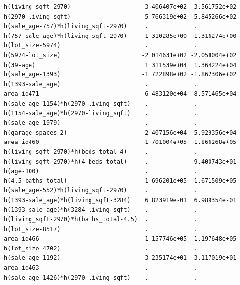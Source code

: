 \documentclass[
]{article}
\begin{document}
\begin{verbatim}
h(living_sqft-2970)                     3.406407e+02  3.561752e+02
h(2970-living_sqft)                    -5.766319e+02 -5.845266e+02
h(sale_age-757)*h(living_sqft-2970)     .             .           
h(757-sale_age)*h(living_sqft-2970)     1.310285e+00  1.316274e+00
h(lot_size-5974)                        .             .           
h(5974-lot_size)                       -2.014631e+02 -2.058004e+02
h(39-age)                               1.311539e+04  1.364224e+04
h(sale_age-1393)                       -1.722898e+02 -1.862306e+02
h(1393-sale_age)                        .             .           
area_id471                             -6.483120e+04 -8.571465e+04
h(sale_age-1154)*h(2970-living_sqft)    .             .           
h(1154-sale_age)*h(2970-living_sqft)    .             .           
h(sale_age-1979)                        .             .           
h(garage_spaces-2)                     -2.407156e+04 -5.929356e+04
area_id460                              1.701004e+05  1.866268e+05
h(living_sqft-2970)*h(beds_total-4)     .             .           
h(living_sqft-2970)*h(4-beds_total)     .            -9.400743e+01
h(age-100)                              .             .           
h(4.5-baths_total)                     -1.696201e+05 -1.671509e+05
h(sale_age-552)*h(living_sqft-2970)     .             .           
h(1393-sale_age)*h(living_sqft-3284)    6.823919e-01  6.989354e-01
h(1393-sale_age)*h(3284-living_sqft)    .             .           
h(living_sqft-2970)*h(baths_total-4.5)  .             .           
h(lot_size-8517)                        .             .           
area_id466                              1.157746e+05  1.197648e+05
h(lot_size-4702)                        .             .           
h(sale_age-1192)                       -3.235174e+01 -3.117019e+01
area_id463                              .             .           
h(sale_age-1426)*h(2970-living_sqft)    .             .           
                                                                  

\end{verbatim}
\end{document}
